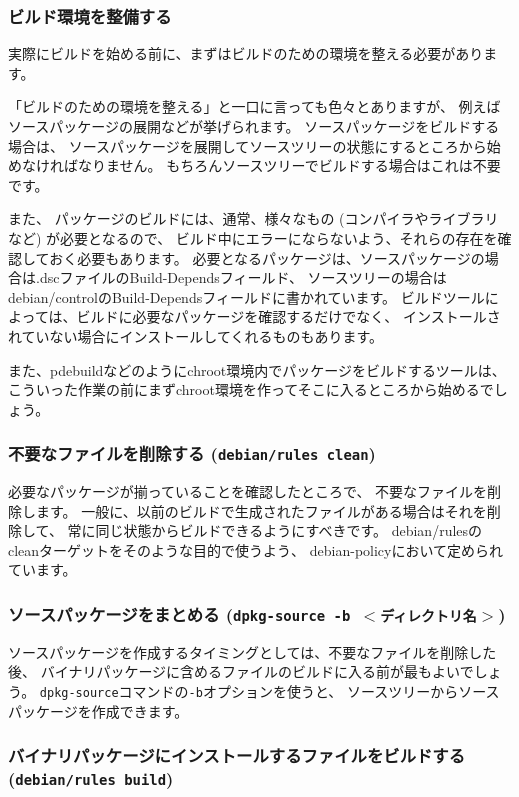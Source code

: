 \documentclass[mingoth,a4paper]{jsarticle}
\begin{document}
\subsubsection{ビルド環境を整備する}

実際にビルドを始める前に、まずはビルドのための環境を整える必要があります。

「ビルドのための環境を整える」と一口に言っても色々とありますが、
例えばソースパッケージの展開などが挙げられます。
ソースパッケージをビルドする場合は、
ソースパッケージを展開してソースツリーの状態にするところから始めなければなりません。
もちろんソースツリーでビルドする場合はこれは不要です。

また、
パッケージのビルドには、通常、様々なもの (コンパイラやライブラリなど) が必要となるので、
ビルド中にエラーにならないよう、それらの存在を確認しておく必要もあります。
必要となるパッケージは、ソースパッケージの場合は.dscファイルのBuild-Dependsフィールド、
ソースツリーの場合はdebian/controlのBuild-Dependsフィールドに書かれています。
ビルドツールによっては、ビルドに必要なパッケージを確認するだけでなく、
インストールされていない場合にインストールしてくれるものもあります。

また、pdebuildなどのようにchroot環境内でパッケージをビルドするツールは、
こういった作業の前にまずchroot環境を作ってそこに入るところから始めるでしょう。

\subsubsection{不要なファイルを削除する (\texttt{debian/rules clean})}

必要なパッケージが揃っていることを確認したところで、
不要なファイルを削除します。
一般に、以前のビルドで生成されたファイルがある場合はそれを削除して、
常に同じ状態からビルドできるようにすべきです。
debian/rulesのcleanターゲットをそのような目的で使うよう、
debian-policyにおいて定められています。

\subsubsection{ソースパッケージをまとめる (\texttt{dpkg-source -b $<$ディレクトリ名$>$})}

ソースパッケージを作成するタイミングとしては、不要なファイルを削除した後、
バイナリパッケージに含めるファイルのビルドに入る前が最もよいでしょう。
\texttt{dpkg-source}コマンドの\texttt{-b}オプションを使うと、
ソースツリーからソースパッケージを作成できます。

\subsubsection{バイナリパッケージにインストールするファイルをビルドする (\texttt{debian/rules build})}
\end{document}
